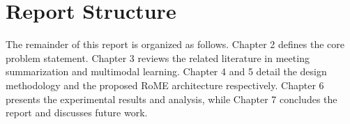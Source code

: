 \section{Report Structure}
The remainder of this report is organized as follows. Chapter 2 defines the core problem statement. Chapter 3 reviews the related literature in meeting summarization and multimodal learning. Chapter 4 and 5 detail the design methodology and the proposed RoME architecture respectively. Chapter 6 presents the experimental results and analysis, while Chapter 7 concludes the report and discusses future work.

